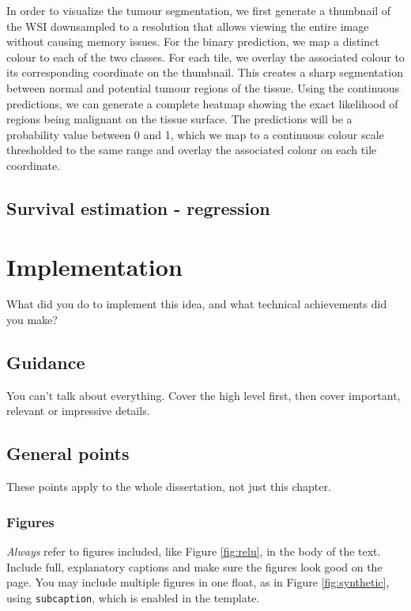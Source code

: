 \documentclass{l4proj}
\begin{document}
In order to visualize the tumour segmentation, we first generate a thumbnail of the WSI downsampled to a resolution that allows viewing the entire image without causing memory issues. For the binary prediction, we map a distinct colour to each of the two classes. For each tile, we overlay the associated colour to its corresponding coordinate on the thumbnail. This creates a sharp segmentation between normal and potential tumour regions of the tissue. Using the continuous predictions, we can generate a complete heatmap showing the exact likelihood of regions being malignant on the tissue surface. The predictions will be a probability value between 0 and 1, which we map to a continuous colour scale thresholded to the same range and overlay the associated colour on each tile coordinate. 

\section{Survival estimation - regression}

\chapter{Implementation}
What did you do to implement this idea, and what technical achievements did you make?
\section{Guidance}
You can't talk about everything. Cover the high level first, then cover important, relevant or impressive details.



\section{General points}

These points apply to the whole dissertation, not just this chapter.



\subsection{Figures}
\emph{Always} refer to figures included, like Figure \ref{fig:relu}, in the body of the text. Include full, explanatory captions and make sure the figures look good on the page.
You may include multiple figures in one float, as in Figure \ref{fig:synthetic}, using \texttt{subcaption}, which is enabled in the template.
\end{document}
